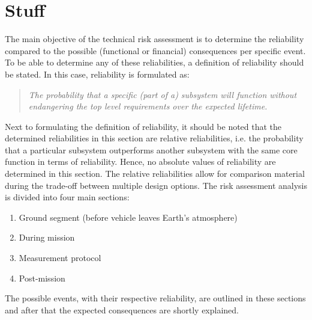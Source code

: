 \documentclass[11pt]{report}
\begin{document}
\chapter{Stuff}



\label{RiskMan}
The main objective of the technical risk assessment is to determine the reliability compared to the possible (functional or financial) consequences per specific event. To be able to determine any of these reliabilities, a definition of reliability should be stated. In this case, reliability is formulated as:
\begin{quote}
\emph{The probability that a specific (part of a) subsystem will function without endangering the top level requirements over the expected lifetime.}
\end{quote}


Next to formulating the definition of reliability, it should be noted that the determined reliabilities in this section are relative reliabilities, i.e. the probability that a particular subsystem outperforms another subsystem with the same core function in terms of reliability. Hence, no absolute values of reliability are determined in this section. The relative reliabilities allow for comparison material during the trade-off between multiple design options. 
The risk assessment analysis is divided into four main sections: 
\begin{enumerate}[I]
	\item Ground segment (before vehicle leaves Earth's atmosphere)
	\item During mission
	\item Measurement protocol
	\item Post-mission
\end{enumerate}
The possible events, with their respective reliability, are outlined in these sections and after that the expected consequences are shortly explained. 
\end{document}
